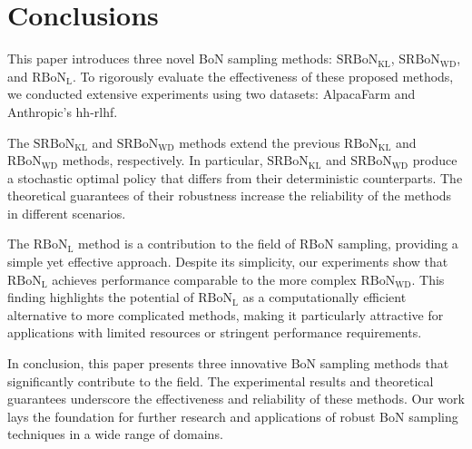 \section{Conclusions}

This paper introduces three novel BoN sampling methods: $\mathrm{SRBoN}_{\mathrm{KL}}$, $\mathrm{SRBoN}_{\mathrm{WD}}$, and $\mathrm{RBoN}_{\mathrm{L}}$. To rigorously evaluate the effectiveness of these proposed methods, we conducted extensive experiments using two datasets: AlpacaFarm and Anthropic's hh-rlhf.

The $\mathrm{SRBoN}_{\mathrm{KL}}$ and $\mathrm{SRBoN}_{\mathrm{WD}}$ methods extend the previous $\mathrm{RBoN}_{\mathrm{KL}}$ and $\mathrm{RBoN}_{\mathrm{WD}}$ methods, respectively. In particular, $\mathrm{SRBoN}_{\mathrm{KL}}$ and $\mathrm{SRBoN}_{\mathrm{WD}}$ produce a stochastic optimal policy that differs from their deterministic counterparts. The theoretical guarantees of their robustness increase the reliability of the methods in different scenarios.

The $\mathrm{RBoN}_{\mathrm{L}}$ method is a contribution to the field of RBoN sampling, providing a simple yet effective approach. Despite its simplicity, our experiments show that $\mathrm{RBoN}_{\mathrm{L}}$ achieves performance comparable to the more complex $\mathrm{RBoN}_{\mathrm{WD}}$. This finding highlights the potential of $\mathrm{RBoN}_{\mathrm{L}}$ as a computationally efficient alternative to more complicated methods, making it particularly attractive for applications with limited resources or stringent performance requirements.


In conclusion, this paper presents three innovative BoN sampling methods that significantly contribute to the field. The experimental results and theoretical guarantees underscore the effectiveness and reliability of these methods. Our work lays the foundation for further research and applications of robust BoN sampling techniques in a wide range of domains.

